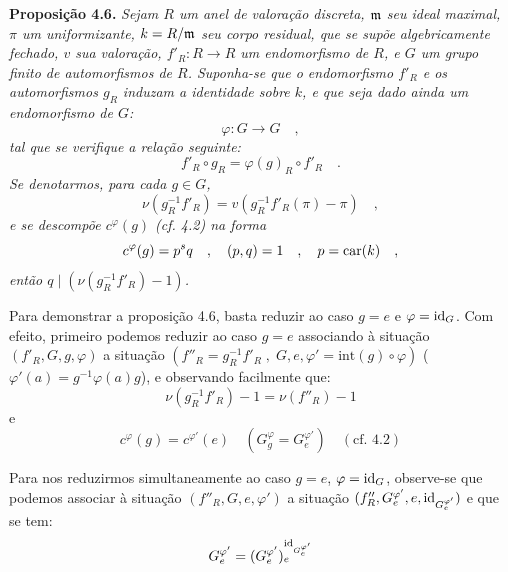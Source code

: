 \medskip
\noindent
\textbf{Proposição 4.6.} \emph{Sejam $R$ um anel de valoração discreta, $\mathfrak m$ seu ideal maximal, $\pi$ um uniformizante, $k = R/\mathfrak m$ seu corpo residual, que se supõe algebricamente fechado, $v$ sua valoração, $f'_R : R \to R$ um endomorfismo de $R$, e $G$ um grupo finito de automorfismos de $R$. Suponha-se que o endomorfismo $f'_R$ e os automorfismos $g_R$ induzam a identidade sobre $k$, e que seja dado ainda um endomorfismo de $G$:
\[
\varphi : G \longrightarrow G \quad ,
\]
tal que se verifique a relação seguinte:
\[
f'_R \circ g_R = \varphi(g)_R \circ f'_R \quad .
\]
Se denotarmos, para cada $g \in G$,
\[
\nu(g_R^{-1}f'_R) = v(g_R^{-1}f'_R(\pi) - \pi) \quad ,
\]
e se descompõe $c^\varphi(g)$ (cf. 4.2) na forma
\[
c^\varphi(g) = p^s q \quad , \quad (p,q) = 1 \quad , \quad p = \operatorname{car}(k) \quad ,
\]
então $q \mid (\nu(g_R^{-1}f'_R) - 1)$.}

\medskip

Para demonstrar a proposição 4.6, basta reduzir ao caso $g = e$ e $\varphi = \operatorname{id}_G$. Com efeito, primeiro podemos reduzir ao caso $g = e$ associando à situação $(f'_R, G, g, \varphi)$ a situação $(f''_R = g_R^{-1}f'_R \; , \; G, e, \varphi' = \mathrm{int}(g) \circ \varphi)$ ($\varphi'(a) = g^{-1}\varphi(a)g$), e observando facilmente que:
\[
\nu(g_R^{-1}f'_R) - 1 = \nu(f''_R) - 1
\]
e
\[
c^\varphi(g) = c^{\varphi'}(e) \quad (G_g^\varphi = G_e^{\varphi'}) \quad (\text{cf. 4.2})
\]

Para nos reduzirmos simultaneamente ao caso $g = e$, $\varphi = \operatorname{id}_G$, observe-se que podemos associar à situação $(f''_R, G, e, \varphi')$ a situação $(f''_R, G_e^{\varphi'}, e, \operatorname{id}_{G_e^{\varphi'}})$ e que se tem:
\[
G_e^{\varphi'} = (G_e^{\varphi'})_e^{\operatorname{id}_{G_e^{\varphi'}}}
\]
